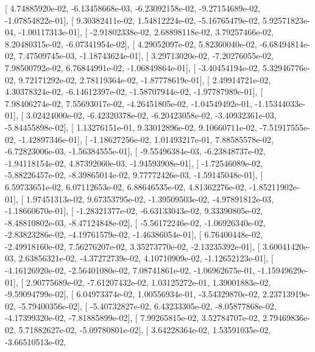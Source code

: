 \documentclass{article}
\begin{document}
       [  4.74885920e-02,  -6.13458668e-03,  -6.23092158e-02,
         -9.27154689e-02,  -1.07854822e-01],
       [  9.30382411e-02,   1.54812224e-02,  -5.16765479e-02,
          5.92571823e-04,  -1.00117313e-01],
       [ -2.91802338e-02,   2.68898118e-02,   3.79257466e-02,
          8.20480315e-02,  -6.07341954e-02],
       [  4.29052097e-02,   5.82360040e-02,  -6.68494814e-02,
          7.47509745e-03,  -1.18743624e-01],
       [  3.29713020e-02,  -7.20276055e-02,   7.98500792e-02,
          6.76844991e-02,  -1.06849864e-01],
       [ -3.40454194e-02,   5.32946776e-02,   9.72171292e-02,
          2.78119364e-02,  -1.87778619e-01],
       [  2.49914721e-02,   4.30378324e-02,  -6.14612397e-02,
         -1.58707944e-02,  -1.97787989e-01],
       [  7.98406274e-02,   7.55693017e-02,  -4.26451805e-02,
         -1.04549492e-01,  -1.15344033e-01],
       [  3.02424000e-02,  -6.42320378e-02,  -6.20423058e-02,
         -3.40932361e-03,  -5.84455898e-02],
       [  1.13276151e-01,   9.33012896e-02,   9.10660711e-02,
         -7.51917555e-02,  -1.42897346e-01],
       [ -1.18627256e-02,   1.01493217e-01,   7.88585578e-02,
         -6.72823006e-03,  -1.56384555e-01],
       [ -9.55496384e-03,  -6.23848737e-02,  -1.94118154e-02,
          4.87392060e-03,  -1.94593908e-01],
       [ -1.72546089e-02,  -5.88226457e-02,  -8.39865014e-02,
          9.77772426e-03,  -1.59145048e-01],
       [  6.59733651e-02,   6.07112653e-02,   6.88646535e-02,
          4.81362276e-02,  -1.85211902e-01],
       [  1.97451313e-02,   9.67353795e-02,  -1.39509503e-02,
         -4.97891812e-03,  -1.18660670e-01],
       [ -1.28321377e-02,  -6.63133043e-02,   9.33390805e-02,
         -8.48810802e-03,  -8.47124848e-02],
       [ -5.56172246e-02,  -1.06926340e-02,  -2.83823286e-02,
         -4.19761579e-02,  -1.46386054e-01],
       [  6.76400448e-02,  -2.49918160e-02,   7.56276207e-02,
          3.35273770e-02,  -2.13235392e-01],
       [  3.60041420e-03,   2.63856321e-02,  -4.37272739e-02,
          4.10710909e-02,  -1.12652123e-01],
       [ -4.16126920e-02,  -2.56401080e-02,   7.08741861e-02,
         -1.06962675e-01,  -1.15949629e-01],
       [  2.90775689e-02,  -7.61207432e-02,   1.03125272e-01,
          1.39001883e-02,  -9.59094799e-02],
       [  6.04973374e-02,   1.00556934e-01,  -3.54329870e-02,
          2.23713919e-02,  -5.79400356e-02],
       [ -5.40732827e-02,   6.43233305e-02,  -8.05877868e-02,
         -4.17399320e-02,  -7.81885899e-02],
       [  7.99265815e-02,   3.52784707e-02,   2.79469836e-02,
          5.71882627e-02,  -5.09780801e-02],
       [  3.64228364e-02,   1.53591035e-02,  -3.66510513e-02,
\end{document}
